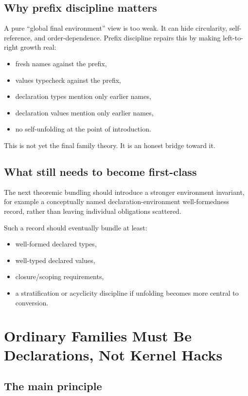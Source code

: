 \documentclass[11pt]{article}
\begin{document}
\subsection{Why prefix discipline matters}

A pure ``global final environment'' view is too weak. It can hide circularity,
self-reference, and order-dependence. Prefix discipline repairs this by making
left-to-right growth real:
\begin{itemize}[leftmargin=2em]
  \item fresh names against the prefix,
  \item values typecheck against the prefix,
  \item declaration types mention only earlier names,
  \item declaration values mention only earlier names,
  \item no self-unfolding at the point of introduction.
\end{itemize}

This is not yet the final family theory. It is an honest bridge toward it.

\subsection{What still needs to become first-class}

The next theoremic bundling should introduce a stronger environment invariant,
for example a conceptually named declaration-environment well-formedness record,
rather than leaving individual obligations scattered.

Such a record should eventually bundle at least:
\begin{itemize}[leftmargin=2em]
  \item well-formed declared types,
  \item well-typed declared values,
  \item closure/scoping requirements,
  \item a stratification or acyclicity discipline if unfolding becomes more
  central to conversion.
\end{itemize}

\section{Ordinary Families Must Be Declarations, Not Kernel Hacks}

\subsection{The main principle}
\end{document}
